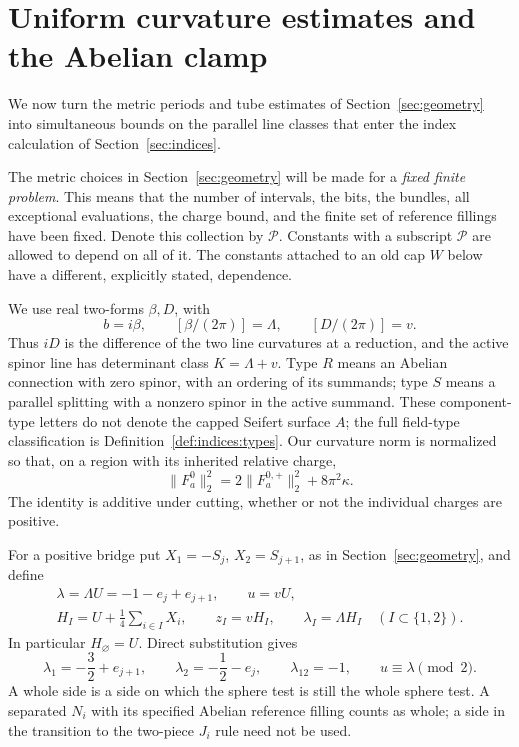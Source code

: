 \section[Curvature estimates and the Abelian clamp]{Uniform curvature estimates and the Abelian clamp}
\label{sec:estimates}

We now turn the metric periods and tube estimates of
Section~\ref{sec:geometry} into simultaneous bounds on the parallel line
classes that enter the index calculation of Section~\ref{sec:indices}.

The metric choices in Section~\ref{sec:geometry} will be made for a
\emph{fixed finite problem}.  This means that the number of intervals, the
bits, the bundles, all exceptional evaluations, the charge bound, and the
finite set of reference fillings have been fixed.  Denote this collection
by $\mathcal P$.  Constants with a subscript $\mathcal P$ are allowed to
depend on all of it.  The constants attached to an old cap $W$ below have
a different, explicitly stated, dependence.

We use real two-forms $\beta,D$, with
\[
 b=i\beta,\qquad [\beta/(2\pi)]=\Lambda,
 \qquad [D/(2\pi)]=v.
\]
Thus $iD$ is the difference of the two line curvatures at a reduction,
and the active spinor line has determinant class $K=\Lambda+v$.
Type $R$ means an Abelian connection with zero spinor, with an ordering
of its summands; type $S$ means a parallel splitting with a nonzero
spinor in the active summand.  These component-type letters do not
denote the capped Seifert surface $A$; the full field-type classification
is Definition~\ref{def:indices:types}.  Our curvature norm is normalized
so that, on a region with its inherited relative charge,
\begin{equation}
 \|F_a^0\|_2^2
   =2\|F_a^{0,+}\|_2^2+8\pi^2\kappa.
 \label{eq:estimates:energy-charge}
\end{equation}
The identity is additive under cutting, whether or not the individual
charges are positive.

For a positive bridge put $X_1=-S_j$, $X_2=S_{j+1}$, as in
Section~\ref{sec:geometry}, and define
\begin{equation}
 \begin{gathered}
 \lambda=\Lambda U=-1-e_j+e_{j+1},\qquad u=vU,\\
 H_I=U+\frac14\sum_{i\in I}X_i,\qquad
 z_I=vH_I,\qquad \lambda_I=\Lambda H_I
 \quad(I\subset\{1,2\}).
 \end{gathered}
 \label{eq:estimates:vertices}
\end{equation}
In particular $H_\varnothing=U$.  Direct substitution gives
\begin{equation}
 \lambda_1=-\frac32+e_{j+1},\qquad
 \lambda_2=-\frac12-e_j,\qquad
 \lambda_{12}=-1,
 \qquad u\equiv\lambda\pmod2.
 \label{eq:estimates:vertex-values}
\end{equation}
A whole side is a side on which the sphere test is still the whole
sphere test.  A separated $N_i$ with its specified Abelian reference
filling counts as whole; a side in the transition to the two-piece
$J_i$ rule need not be used.

